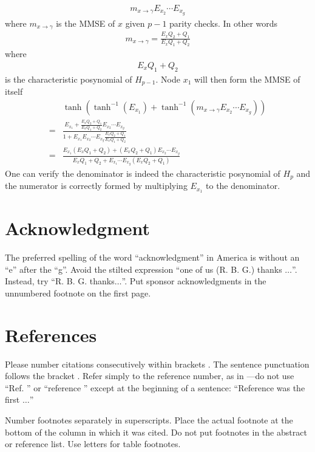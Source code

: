 \documentclass[conference]{IEEEtran}
\begin{document}
\begin{align*}
m_{x\rightarrow\gamma}E_{x_2}\cdots E_{x_g}
\end{align*}
where $m_{x\rightarrow\gamma}$ is the MMSE of $x$ given $p-1$ parity checks. In other words
\begin{align}
m_{x\rightarrow\gamma} = \frac{E_xQ_2+Q_1}{E_xQ_1+Q_2}
\end{align}
where 
\begin{align*}
E_xQ_1+Q_2
\end{align*}
is the characteristic posynomial of $H_{p-1}$. Node $x_1$ will then form the MMSE of itself
\begin{align}
&\tanh\left(\tanh^{-1}(E_{x_1})+\tanh^{-1}\left(m_{x\rightarrow\gamma}E_{x_2}\cdots E_{x_g}\right)\right)\\
=&\frac{E_{x_1}+\frac{E_xQ_2+Q_1}{E_xQ_1+Q_2}E_{x_2}\cdots E_{x_g}}{1+E_{x_1}E_{x_2}\cdots E_{x_g}\frac{E_xQ_2+Q_1}{E_xQ_1+Q_2}}\\
=&\frac{E_{x_1}(E_xQ_1+Q_2)+(E_xQ_2+Q_1)E_{x_2}\cdots E_{x_g}}{E_xQ_1+Q_2+E_{x_1}\cdots E_{x_g}(E_xQ_2+Q_1)}
\end{align}
One can verify the denominator is indeed the characteristic posynomial of $H_p$ and the numerator is correctly formed by multiplying $E_{x_1}$ to the denominator.

\section*{Acknowledgment}

The preferred spelling of the word ``acknowledgment'' in America is without 
an ``e'' after the ``g''. Avoid the stilted expression ``one of us (R. B. 
G.) thanks $\ldots$''. Instead, try ``R. B. G. thanks$\ldots$''. Put sponsor 
acknowledgments in the unnumbered footnote on the first page.

\section*{References}

Please number citations consecutively within brackets \cite{b1}. The 
sentence punctuation follows the bracket \cite{b2}. Refer simply to the reference 
number, as in \cite{b3}---do not use ``Ref. \cite{b3}'' or ``reference \cite{b3}'' except at 
the beginning of a sentence: ``Reference \cite{b3} was the first $\ldots$''

Number footnotes separately in superscripts. Place the actual footnote at 
the bottom of the column in which it was cited. Do not put footnotes in the 
abstract or reference list. Use letters for table footnotes.
\end{document}
